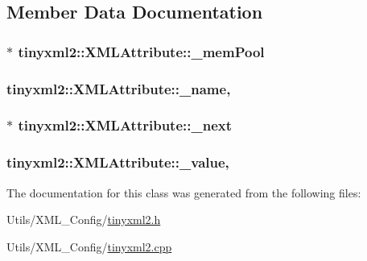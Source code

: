 \subsection{Member Data Documentation}
\hypertarget{classtinyxml2_1_1_x_m_l_attribute_ac0a1130568dd9e985dd7753ae44fcdbf}{
\subsubsection[{\-\_\-mem\-Pool}]{$\ast$ tinyxml2\-::\-X\-M\-L\-Attribute\-::\-\_\-mem\-Pool\hspace{0.3cm}{\ttfamily [private]}}}\label{classtinyxml2_1_1_x_m_l_attribute_ac0a1130568dd9e985dd7753ae44fcdbf}
\hypertarget{classtinyxml2_1_1_x_m_l_attribute_a80850208963b536e9254a7fa1d4abe67}{
\subsubsection[{\-\_\-name}]{ tinyxml2\-::\-X\-M\-L\-Attribute\-::\-\_\-name\hspace{0.3cm}{\ttfamily [mutable]}, {\ttfamily [private]}}}\label{classtinyxml2_1_1_x_m_l_attribute_a80850208963b536e9254a7fa1d4abe67}
\hypertarget{classtinyxml2_1_1_x_m_l_attribute_a3bbf00f77131a8e83d648d32d090c564}{
\subsubsection[{\-\_\-next}]{$\ast$ tinyxml2\-::\-X\-M\-L\-Attribute\-::\-\_\-next\hspace{0.3cm}{\ttfamily [private]}}}\label{classtinyxml2_1_1_x_m_l_attribute_a3bbf00f77131a8e83d648d32d090c564}
\hypertarget{classtinyxml2_1_1_x_m_l_attribute_abcf5c9b7f040ed71ed2a66557584b5b0}{
\subsubsection[{\-\_\-value}]{ tinyxml2\-::\-X\-M\-L\-Attribute\-::\-\_\-value\hspace{0.3cm}{\ttfamily [mutable]}, {\ttfamily [private]}}}\label{classtinyxml2_1_1_x_m_l_attribute_abcf5c9b7f040ed71ed2a66557584b5b0}


The documentation for this class was generated from the following files\-:\begin{DoxyCompactItemize}
\item 
Utils/\-X\-M\-L\-\_\-\-Config/\hyperlink{tinyxml2_8h}{tinyxml2.\-h}\item 
Utils/\-X\-M\-L\-\_\-\-Config/\hyperlink{tinyxml2_8cpp}{tinyxml2.\-cpp}\end{DoxyCompactItemize}
